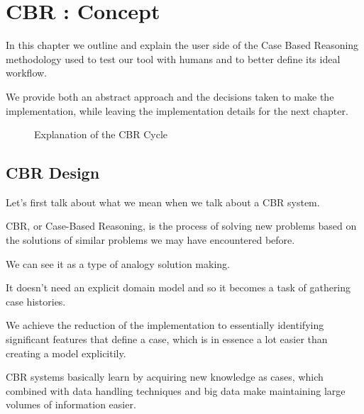 %
%

\chapter{CBR : Concept}

\begin{resumen}
In this chapter we outline and explain the user side of the Case Based Reasoning methodology used to test our tool with humans and to better define its ideal workflow.

We provide both an abstract approach and the decisions taken to make the implementation, while leaving the implementation details for the next chapter.
\end{resumen}

\linespread{1.6}

\begin{figure}[!htb]
    \caption{\label{fig:my-label} Explanation of the CBR Cycle \cite{AamodtPlaza}}
\end{figure}

\section{CBR Design}
\label{cap5:sec:introduccion}

Let's first talk about what we mean when we talk about a CBR system.

CBR, or Case-Based Reasoning, is the process of solving new problems based on the solutions of similar problems we may have encountered before.

We can see it as a type of analogy solution making.

It doesn't need an explicit domain model and so it becomes a task of gathering case histories. 

We achieve the reduction of the implementation to essentially identifying significant features that define a case, which is in essence a lot easier than creating a model explicitily. 

CBR systems basically learn by acquiring new knowledge as cases, which combined with data handling techniques and big data make maintaining large volumes of information easier.

